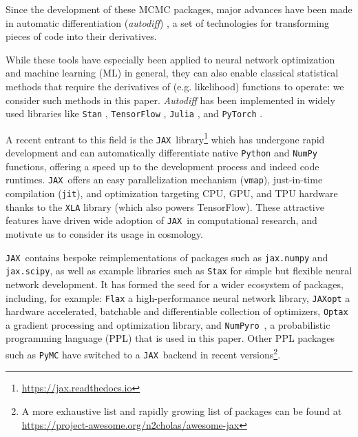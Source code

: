 \documentclass[twocolumn,twocolappendix,nofootinbib,iop]{openjournal}
\newcommand{\numpyro}{\texttt{NumPyro}}
\newcommand{\jax}{\texttt{JAX}}
\begin{document}

Since the development of these MCMC packages, major advances have been made in automatic differentiation (\textit{autodiff}) \citep{10.5555/3122009.3242010, Margossian2019}, a set of technologies for transforming pieces of code into their derivatives.

While these tools have especially been applied to neural network optimization and machine learning (ML) in general, they can also enable classical statistical methods that require the derivatives of (e.g. likelihood) functions to operate: we consider such methods in this paper. \textit{Autodiff} has been implemented in widely used libraries like \texttt{Stan} \citep{JSSv076i01}, \texttt{TensorFlow} \citep{tensorflow2015-whitepaper}, \texttt{Julia} \citep{bezanson2017julia}, and \texttt{PyTorch} \citep{NEURIPS2019_9015}. 

A recent entrant to this field is the \jax\ library\footnote{\url{https://jax.readthedocs.io}} \citep{jax2018github} which has undergone rapid development and can automatically differentiate native \texttt{Python} and \texttt{NumPy} functions, offering a speed up to the development process and indeed code runtimes. \jax\ offers an easy parallelization mechanism (\texttt{vmap}), just-in-time compilation (\texttt{jit}), and optimization targeting CPU, GPU, and TPU hardware thanks to the \texttt{XLA} library (which also powers TensorFlow). These attractive features have driven wide adoption of \jax\ in computational research, and motivate us to consider its usage in cosmology.

\jax\ contains bespoke reimplementations of packages such as \texttt{jax.numpy} and \texttt{jax.scipy}, as well as example libraries such as \texttt{Stax} for simple but flexible neural network development. It has formed the seed for a wider ecosystem of packages, including, for example: 
\texttt{Flax} \citep{flax2020github} a high-performance neural network library, \texttt{JAXopt} \citep{jaxopt_implicit_diff} a hardware accelerated, batchable and differentiable collection of optimizers, \texttt{Optax} \citep{optax2020github} a gradient processing and optimization library, and \numpyro\ \citep{phan2019composable,bingham2019pyro}, a probabilistic programming language (PPL) that is used in this paper. Other PPL packages such as \texttt{PyMC} \citep{Salvatier2016} have switched to a \jax\ backend in recent versions\footnote{A more exhaustive list and rapidly growing list of packages can be found at \url{https://project-awesome.org/n2cholas/awesome-jax}}.
\end{document}
